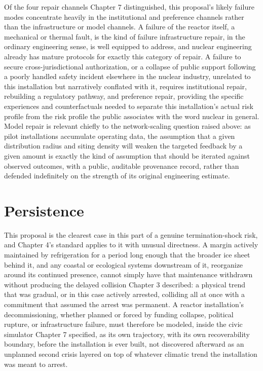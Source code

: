 \documentclass[11pt,oneside]{book}
\begin{document}
Of the four repair channels Chapter 7 distinguished, this proposal's likely failure modes concentrate heavily in the institutional and preference channels rather than the infrastructure or model channels. A failure of the reactor itself, a mechanical or thermal fault, is the kind of failure infrastructure repair, in the ordinary engineering sense, is well equipped to address, and nuclear engineering already has mature protocols for exactly this category of repair. A failure to secure cross-jurisdictional authorization, or a collapse of public support following a poorly handled safety incident elsewhere in the nuclear industry, unrelated to this installation but narratively conflated with it, requires institutional repair, rebuilding a regulatory pathway, and preference repair, providing the specific experiences and counterfactuals needed to separate this installation's actual risk profile from the risk profile the public associates with the word nuclear in general. Model repair is relevant chiefly to the network-scaling question raised above: as pilot installations accumulate operating data, the assumption that a given distribution radius and siting density will weaken the targeted feedback by a given amount is exactly the kind of assumption that should be iterated against observed outcomes, with a public, auditable provenance record, rather than defended indefinitely on the strength of its original engineering estimate.

\section*{Persistence}

This proposal is the clearest case in this part of a genuine termination-shock risk, and Chapter 4's standard applies to it with unusual directness. A margin actively maintained by refrigeration for a period long enough that the broader ice sheet behind it, and any coastal or ecological systems downstream of it, reorganize around its continued presence, cannot simply have that maintenance withdrawn without producing the delayed collision Chapter 3 described: a physical trend that was gradual, or in this case actively arrested, colliding all at once with a commitment that assumed the arrest was permanent. A reactor installation's decommissioning, whether planned or forced by funding collapse, political rupture, or infrastructure failure, must therefore be modeled, inside the civic simulator Chapter 7 specified, as its own trajectory, with its own recoverability boundary, before the installation is ever built, not discovered afterward as an unplanned second crisis layered on top of whatever climatic trend the installation was meant to arrest.
\end{document}
